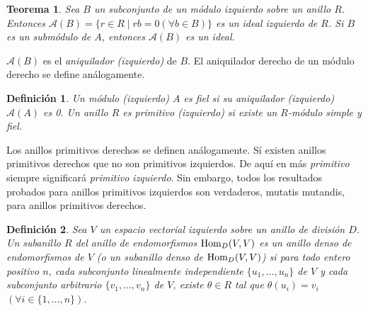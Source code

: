 \documentclass{report}
\newcommand{\Hom}{\textnormal{Hom}}
\newtheorem{theorem}{Teorema}
\newtheorem{definition}{Definición}
\begin{document}
  \begin{theorem}
    Sea \(B\) un subconjunto de un módulo izquierdo sobre un anillo \(R\).
    Entonces \(\mathcal{A}(B) = \{r \in R \mid r b = 0 (\forall b \in B)\}\) es un ideal izquierdo de \(R\).
    Si \(B\) es un submódulo de \(A\), entonces \(\mathcal{A}(B)\) es un ideal.
  \end{theorem}
  \(\mathcal{A}(B)\) es el \emph{aniquilador (izquierdo)} de \(B\).
  El aniquilador derecho de un módulo derecho se define análogamente.

  \begin{definition}
    Un módulo (izquierdo) \(A\) es \emph{fiel} si su aniquilador (izquierdo) \(\mathcal{A}(A)\) es 0.
    Un anillo \(R\) es \emph{primitivo} (\emph{izquierdo}) si existe un \(R\)-módulo simple y fiel.
  \end{definition}

  Los anillos primitivos derechos se definen análogamente.
  Sí existen anillos primitivos derechos que no son primitivos izquierdos.
  De aquí en más \emph{primitivo} siempre significará \emph{primitivo izquierdo}.
  Sin embargo, todos los resultados probados para anillos primitivos izquierdos son verdaderos, mutatis mutandis, para anillos primitivos derechos.

  \begin{definition}
    Sea \(V\) un espacio vectorial izquierdo sobre un anillo de división \(D\).
    Un subanillo \(R\) del anillo de endomorfismos \(\Hom_D(V, V)\) es un \emph{anillo denso de endomorfismos} de \(V\) (o un \emph{subanillo denso} de \(\Hom_D(V, V)\)) si para todo entero positivo \(n\), cada subconjunto linealmente independiente \(\{u_1, \dots, u_n\}\) de \(V\) y cada subconjunto arbitrario \(\{v_1, \dots, v_n\}\) de \(V\), existe \(\theta \in R\) tal que \(\theta(u_i) = v_i\) \((\forall i \in \{1, \dots, n\})\).
  \end{definition}
\end{document}
